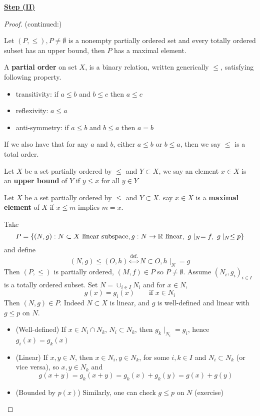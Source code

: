 \documentclass{article}
\begin{document}
\underline{\textbf{Step (II)}}\nl
\begin{proof}(continued:)
\begin{lemma}\nl
\label{Zorn's Lemma}
	Let $(P, \leq), P\neq \emptyset$ is a nonempty partially ordered set and every totally ordered subset has an upper bound, then $P$ has a maximal element.
\end{lemma}  
\begin{unexaminable}
    \begin{definition}
\nl
	A \textbf{partial order} on set $X$, is a binary relation, written generically $\leq$, satisfying following property.
	\begin{itemize}
		\item transitivity: if $a\leq b$ and $b\leq c$ then $a\leq c$
		\item reflexivity: $a\leq a$
		\item anti-symmetry: if $a\leq b$ and $b\leq a$ then $a=b$

	\end{itemize}
	If we also have that for any $a$ and $b$, either $a\leq b$ or $b\leq a$, then we say $\leq$ is a total order.
\end{definition}

\begin{definition}
\nl
	Let $X$ be a set partially ordered by $\leq$ and $Y\subset X$, we say an element $x\in X$ is an {\bf upper bound} of $Y$ if $y\leq x$ for all $y \in Y$

\end{definition}

\begin{definition}
\nl
	Let $X$ be a set partially ordered by $\leq$ and $Y\subset X$. say $x\in X$ is a \textbf{maximal element} of $X$ if $x\leq m$ implies $m=x$.

\end{definition}
\end{unexaminable}
Take 
$$
P = \{(N,g): N\subset X \ \text{linear\ subspace}, g: N \to \real \ \text{linear}, \ g\mid_N=f, \ g\mid_N \leq p\}
$$  
and define  
$$
(N,g) \leq (O, h ) \overset{\text{def.}}{\iff} N \subset O, h\mid_N = g
$$
Then $(P, \leq)$ is partially ordered, $(M,f) \in P$ so $P \neq \emptyset$. Assume $(N_i, g_i)_{i \in I}$ is a totally ordered subset. Set $N = \cup_{i\in I} N_i$ and for $x\in N$,  
$$
g(x) = g_i(x) \qquad \text{if\ }x\in N_i
$$
Then $(N,g) \in P$. Indeed $N\subset X$ is linear, and $g$ is well-defined and linear with $g\leq p$ on $N$.
\begin{itemize}
    \item (Well-defined) If $x \in N_i \cap N_k$, $N_i \subset N_k$, then $g_k \mid_{N_i}=g_i$, hence $g_i(x)=g_k(x)$
    \item (Linear) If $x,y \in N$, then $x\in N_i, y\in N_k$, for some $i,k \in I$ and $N_i \subset N_k$ (or vice versa), so $x, y \in N_k$ and  
    $$
    g(x+y) = g_k(x+y) = g_k(x)+g_k(y) = g(x) + g(y)
    $$
    \item (Bounded by $p(x)$) Similarly, one can check $g \leq p$ on $N$ (exercise)
\end{itemize}  


\end{proof}
\end{document}
